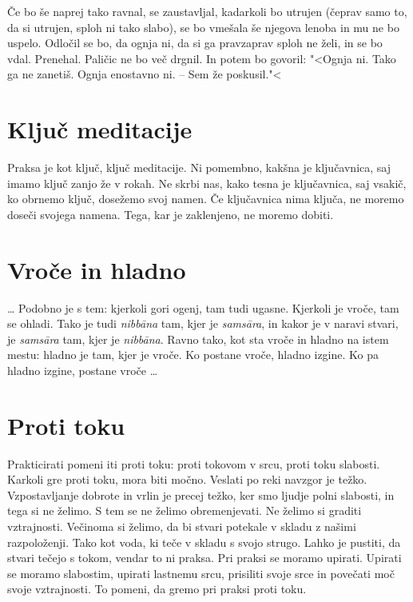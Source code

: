 Če bo še naprej tako ravnal, se zaustavljal, kadarkoli bo utrujen (čeprav samo to, da si utrujen, sploh ni tako slabo), se bo vmešala še njegova lenoba in mu ne bo uspelo. Odločil se bo, da ognja ni, da si ga pravzaprav sploh ne želi, in se bo vdal. Prenehal. Paličic ne bo več drgnil. In potem bo govoril: "<Ognja ni. Tako ga ne zanetiš. Ognja enostavno ni. – Sem že poskusil."<

\section{Ključ meditacije}

Praksa je kot ključ, ključ meditacije. Ni pomembno, kakšna je ključavnica, saj imamo ključ zanjo že v rokah. Ne skrbi nas, kako tesna je ključavnica, saj vsakič, ko obrnemo ključ, dosežemo svoj namen. Če ključavnica nima ključa, ne moremo doseči svojega namena. Tega, kar je zaklenjeno, ne moremo dobiti.

\section{Vroče in hladno}

\ldots{} Podobno je s tem: kjerkoli gori ogenj, tam tudi ugasne. Kjerkoli je vroče, tam se ohladi. Tako je tudi \emph{nibbāna} tam, kjer je \emph{samsāra}, in kakor je v naravi stvari, je \emph{samsāra }tam, kjer je \emph{nibbāna}. Ravno tako, kot sta vroče in hladno na istem mestu: hladno je tam, kjer je vroče. Ko postane vroče, hladno izgine. Ko pa hladno izgine, postane vroče \ldots{}

\section{Proti toku}

Prakticirati pomeni iti proti toku: proti tokovom v srcu, proti toku slabosti. Karkoli gre proti toku, mora biti močno. Veslati po reki navzgor je težko. Vzpostavljanje dobrote in vrlin je precej težko, ker smo ljudje polni slabosti, in tega si ne želimo. S tem se ne želimo obremenjevati. Ne želimo si graditi vztrajnosti. Večinoma si želimo, da bi stvari potekale v skladu z našimi razpoloženji. Tako kot voda, ki teče v skladu s svojo strugo. Lahko je pustiti, da stvari tečejo s tokom, vendar to ni praksa. Pri praksi se moramo upirati. Upirati se moramo slabostim, upirati lastnemu srcu, prisiliti svoje srce in povečati moč svoje vztrajnosti. To pomeni, da gremo pri praksi proti toku.


